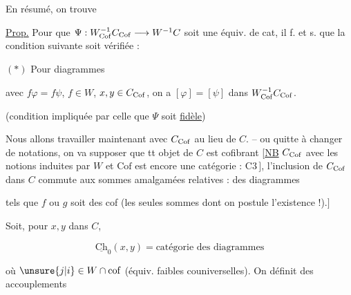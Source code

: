 
En résumé, on trouve

\uline{Prop.} Pour que $\Psi:W_{\rm Cof}^{-1}C_{\rm Cof}\longrightarrow W^{-1}C$ soit une équiv. de cat, il f. et s. que la condition suivante soit vérifiée :

$(\ast)$ Pour  diagrammes


avec $f\varphi=f\psi$, $f\in W$, $x,y\in C_{\rm Cof}$,  on a $[\varphi]=[\psi]$ dans $W_{\rm Cof}^{-1}C_{\rm Cof}$.

(condition impliquée par celle que $\Psi$ soit \uline{fidèle})

Nous allons travailler maintenant avec $C_{\rm Cof}$ au lieu de $C$. -- ou quitte à changer de notations, on va supposer que tt objet de $C$ est cofibrant [\uline{NB} $C_{\rm Cof}$ avec les notions induites par $W$ et $\mathrm{Cof}$ est encore une catégorie  : C3\,$]$, l'inclusion de $C_{\rm Cof}$ dans $C$ commute aux sommes amalgamées  relatives : des diagrammes


tels que $f$ ou $g$ soit des cof (les seules sommes dont on postule l'existence !).$]$

Soit, pour $x,y$ dans $C$,

\[
 \underline{\mathrm{Ch}}_0(x,y)=\text{catégorie des diagrammes}
\]


où $\unsure{j|i}\in W\cap\mathrm{cof}$  (équiv. faibles  couniverselles). On définit des accouplements

